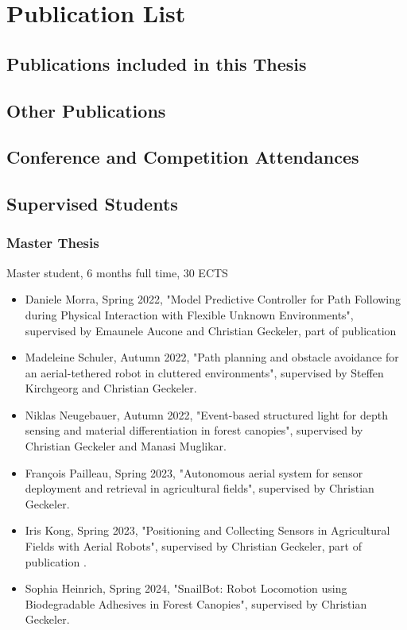 \chapter{Publication List}
\label{ch:publication-list}

\section{Publications included in this Thesis}

\section{Other Publications}

\section{Conference and Competition Attendances}

\section{Supervised Students}

\subsection{Master Thesis}
Master student, 6 months full time, 30 ECTS


\begin{itemize}
    \item Daniele Morra, Spring 2022, "Model Predictive Controller for Path Following during Physical Interaction with Flexible Unknown Environments", supervised by Emaunele Aucone and Christian Geckeler, part of publication \cite{Aucone2024}

    \item  Madeleine Schuler, Autumn 2022, "Path planning and obstacle avoidance for an aerial-tethered robot in cluttered environments", supervised by Steffen Kirchgeorg and Christian Geckeler.

    \item Niklas Neugebauer, Autumn 2022, "Event-based structured light for depth sensing and material differentiation in forest canopies", supervised by Christian Geckeler and Manasi Muglikar.

    \item François Pailleau, Spring 2023, "Autonomous aerial system for sensor deployment and retrieval in agricultural fields", supervised by Christian Geckeler.

    \item Iris Kong, Spring 2023, "Positioning and Collecting Sensors in Agricultural Fields with Aerial Robots", supervised by Christian Geckeler, part of publication \cite{Geckeler2024a}.

    \item Sophia Heinrich, Spring 2024, "SnailBot: Robot Locomotion using Biodegradable Adhesives in Forest Canopies", supervised by Christian Geckeler. 
\end{itemize}


